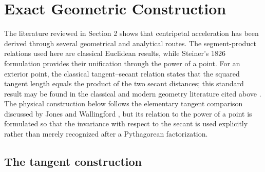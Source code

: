 \documentclass[preprint,12pt,3p,nopreprintline]{elsarticle}
\numberwithin{equation}{section}
\theoremstyle{remark}
\begin{document}
\section{Exact Geometric Construction}\label{sec:exact-geometry}

The literature reviewed in Section 2 shows that centripetal acceleration has been derived through several geometrical and analytical routes. The segment-product relations used here are classical Euclidean results, while Steiner's 1826 formulation \cite{steiner1826einige} provides their unification through the power of a point. For an exterior point, the classical tangent--secant relation states that the squared tangent length equals the product of the two secant distances; this standard result may be found in the classical and modern geometry literature cited above \cite{euclid1956elements,coxeter1967geometry,coxeter1969introduction}. The physical construction below follows the elementary tangent comparison discussed by Jones and Wallingford \cite{jones1969simple}, but its relation to the power of a point is formulated so that the invariance with respect to the secant is used explicitly rather than merely recognized after a Pythagorean factorization.

\subsection{The tangent construction}
\end{document}
